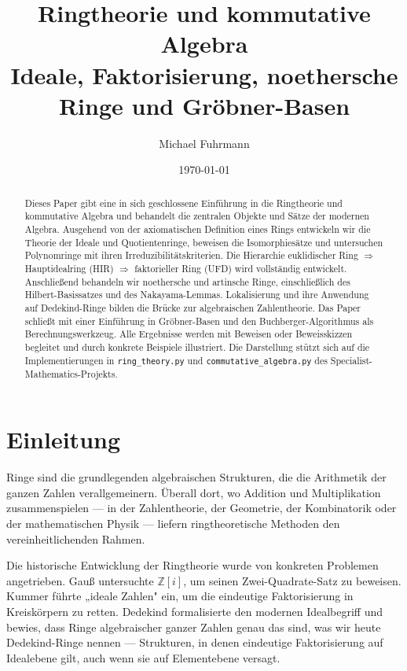 \documentclass[12pt,a4paper]{amsart}
\title{Ringtheorie und kommutative Algebra\\
\large Ideale, Faktorisierung, noethersche Ringe und Gröbner-Basen}
\author{Michael Fuhrmann}
\date{\today}
\theoremstyle{definition}
\theoremstyle{definition}
\begin{document}
\begin{abstract}
Dieses Paper gibt eine in sich geschlossene Einführung in die Ringtheorie und
kommutative Algebra und behandelt die zentralen Objekte und Sätze der modernen
Algebra. Ausgehend von der axiomatischen Definition eines Rings entwickeln wir
die Theorie der Ideale und Quotientenringe, beweisen die Isomorphiesätze und
untersuchen Polynomringe mit ihren Irreduzibilitätskriterien. Die Hierarchie
euklidischer Ring $\Rightarrow$ Hauptidealring (HIR) $\Rightarrow$ faktorieller Ring (UFD)
wird vollständig entwickelt. Anschließend behandeln wir noethersche und artinsche Ringe,
einschließlich des Hilbert-Basissatzes und des Nakayama-Lemmas. Lokalisierung und ihre
Anwendung auf Dedekind-Ringe bilden die Brücke zur algebraischen Zahlentheorie. Das
Paper schließt mit einer Einführung in Gröbner-Basen und den Buchberger-Algorithmus
als Berechnungswerkzeug. Alle Ergebnisse werden mit Beweisen oder Beweissk{}izzen
begleitet und durch konkrete Beispiele illustriert. Die Darstellung stützt sich auf
die Implementierungen in \texttt{ring\_theory.py} und \texttt{commutative\_algebra.py}
des Specialist-Mathematics-Projekts.
\end{abstract}

\maketitle
\tableofcontents

\section{Einleitung}

Ringe sind die grundlegenden algebraischen Strukturen, die die Arithmetik der ganzen
Zahlen verallgemeinern. Überall dort, wo Addition und Multiplikation zusammenspielen ---
in der Zahlentheorie, der Geometrie, der Kombinatorik oder der mathematischen Physik ---
liefern ringtheoretische Methoden den vereinheitlichenden Rahmen.

Die historische Entwicklung der Ringtheorie wurde von konkreten Problemen angetrieben.
Gauß untersuchte $\mathbb{Z}[i]$, um seinen Zwei-Quadrate-Satz zu beweisen.
Kummer führte „ideale Zahlen" ein, um die eindeutige Faktorisierung in Kreiskörpern
zu retten. Dedekind formalisierte den modernen Idealbegriff und bewies, dass Ringe
algebraischer ganzer Zahlen genau das sind, was wir heute Dedekind-Ringe nennen ---
Strukturen, in denen eindeutige Faktorisierung auf Idealebene gilt, auch wenn sie auf
Elementebene versagt.
\end{document}
